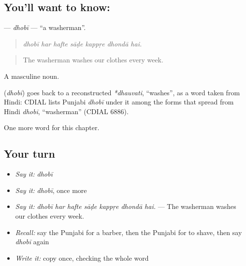 \subsection*{You'll want to know: }
\textbf{} — \emph{dhobī} — \textquotedblleft{}a washerman\textquotedblright{}.

\begin{quote}
      
\end{quote}

\begin{quote}
\emph{dhobī har hafte sāḍe kappṛe dhondā hai.}
\end{quote}

\begin{quote}
The washerman washes our clothes every week.
\end{quote}

A masculine noun.

\begin{cousinweb}
\textbf{} (\emph{dhobī}) goes back to a reconstructed \emph{*dhauvati}, \textquotedblleft{}washes\textquotedblright{}, as a word taken from Hindi: CDIAL lists Punjabi \emph{dhobī} under it among the forms that spread from Hindi \emph{dhobī}, \textquotedblleft{}washerman\textquotedblright{} (CDIAL 6886).
\end{cousinweb}

\begin{grammarlens}[title={What you've built}]
One more word for this chapter.
\end{grammarlens}

\subsection*{Your turn}
\begin{itemize}
\raggedright
  \item \emph{Say it:} \emph{dhobī}
  \item \emph{Say it:} \emph{dhobī}, once more
  \item \emph{Say it:} \emph{dhobī har hafte sāḍe kappṛe dhondā hai.} — The washerman washes our clothes every week.
  \item \emph{Recall:} say the Punjabi for a barber, then the Punjabi for to shave, then say \emph{dhobī} again
  \item \emph{Write it:} copy \textbf{} once, checking the whole word
\end{itemize}

